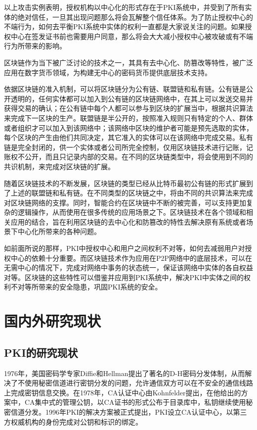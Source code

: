 以上攻击实例表明，授权机构以中心化的形式存在于PKI系统中，并受到了所有实体的绝对信任，一旦其出现问题那么将会瓦解整个信任体系。为了防止授权中心的不端行为，如何去平衡PKI系统中实体的权利一直都是大家说关注的问题。如果授权中心在签发证书前也需要用户同意，那么将会大大减小授权中心被攻破或有不端行为所带来的影响。

区块链作为当下被广泛讨论的技术之一，其具有去中心化、防篡改等特性，被广泛应用在数字货币领域，为构建无中心的密码货币提供底层技术支持。

依据区块链的准入机制，可以将区块链分为公有链、联盟链和私有链。公有链是公开透明的，任何实体都可以加入到公有链的区块链网络中，在其上可以发送交易并获得交易的确认；在公有链中每个人都可以参与到区块的扩展当中，根据共识算法来完成下一区块的生产。联盟链是半公开的，按照准入规则只有特定的个人、群体或者组织才可以加入到该网络中；该网络中区块的维护者可能是预先选取的实体，每个区块的产生由他们共同决定，其它准入的实体可以在该网络中完成交易。私有链是完全封闭的，供一个实体或者公司所完全控制，仅用区块链技术进行记账，记账权不公开，而且只记录内部的交易。在不同的区块链类型中，将会使用到不同的共识机制，来完成对区块链的扩展。


随着区块链技术的不断发展，区块链的类型已经从比特币最初公有链的形式扩展到了上述的联盟链和私有链。在不同类型的区块链之中，将由不同的共识算法来完成对区块链网络的支撑。同时，智能合约在区块链中不断的被完善，可以支持更加复杂的逻辑操作，从而使用在很多传统的应用场景之下。区块链技术在各个领域和相关应用的结合，旨在利用区块链的去中心化和防篡改的特性去解决原有系统或者场景下中心化所带来的各种问题。


如前面所说的那样，PKI中授权中心和用户之间权利不对等，如何去减弱用户对授权中心的依赖十分重要。而区块链技术作为应用在P2P网络中的底层技术，可以在无需中心的情况下，完成对网络中事务的状态统一，保证该网络中实体的各自权益对等。区块链的这些特性可以借鉴并应用到PKI系统中，解决PKI中实体之间的权利不对等所带来的安全隐患，巩固PKI系统的安全。


\section{国内外研究现状}

\subsection{PKI的研究现状}

1976年，美国密码学专家Diffie和Hellman提出了著名的D-H密码分发体制，从而解决了不使用秘密信道进行密钥分发的问题，允许通信双方可以在不安全的通信线路上完成密钥信息交换。在1978年，CA认证中心由Kohnfelder提出，在他给出的方案中，CA集中式的管理公钥，以CA证书的形式公布于目录库中，私钥继续使用秘密信道分发。1996年PKI的解决方案被正式提出，PKI设立CA认证中心，以第三方权威机构的身份完成对公钥和标识的绑定。

